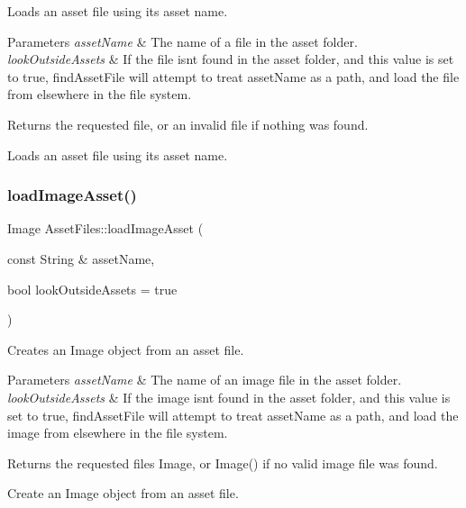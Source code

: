 Loads an asset file using its asset name.


\begin{DoxyParams}{Parameters}
{\em asset\+Name} & The name of a file in the asset folder.\\
\hline
{\em look\+Outside\+Assets} & If the file isn\textquotesingle{}t found in the asset folder, and this value is set to true, find\+Asset\+File will attempt to treat asset\+Name as a path, and load the file from elsewhere in the file system.\\
\hline
\end{DoxyParams}
\begin{DoxyReturn}{Returns}
the requested file, or an invalid file if nothing was found.
\end{DoxyReturn}
Loads an asset file using its asset name. \mbox{\label{namespaceAssetFiles_a40e7c07e1d4cbdeb097b7f4350af0050}} 
\subsubsection{\texorpdfstring{load\+Image\+Asset()}{loadImageAsset()}}
{\footnotesize\ttfamily Image Asset\+Files\+::load\+Image\+Asset (\begin{DoxyParamCaption}\item[{const String \&}]{asset\+Name,  }\item[{bool}]{look\+Outside\+Assets = {\ttfamily true} }\end{DoxyParamCaption})}

Creates an Image object from an asset file.


\begin{DoxyParams}{Parameters}
{\em asset\+Name} & The name of an image file in the asset folder.\\
\hline
{\em look\+Outside\+Assets} & If the image isn\textquotesingle{}t found in the asset folder, and this value is set to true, find\+Asset\+File will attempt to treat asset\+Name as a path, and load the image from elsewhere in the file system.\\
\hline
\end{DoxyParams}
\begin{DoxyReturn}{Returns}
the requested file\textquotesingle{}s Image, or Image() if no valid image file was found.
\end{DoxyReturn}
Create an Image object from an asset file. \mbox{\label{namespaceAssetFiles_a2dafaffb7079b9b899753e8dc5b4b0df}} 
